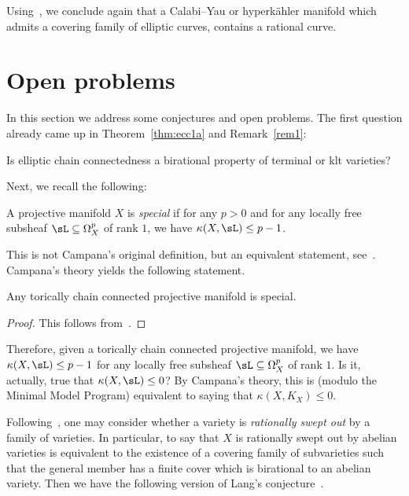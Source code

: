 Using~\cite{DFM16}, we conclude again that a Calabi--Yau or hyperkähler manifold which admits a covering family of elliptic curves, contains a rational curve.

\section{Open problems}\label{Sect.7}
In this section we address some conjectures and open problems. The first question already came up in Theorem~\ref{thm:ecc1a} and Remark~\ref{rem1}:

\begin{problem}\label{prob:main7.1}
Is elliptic chain connectedness a birational property of terminal or klt varieties?
\end{problem}

Next, we recall the following:

\begin{defi}\label{def:main7.2}
A projective manifold $X$ is \emph{special} if for any $p>0$ and for any locally free subsheaf $\sL \subseteq \Omega^p_X$ of rank $1$, we have $\kappa (X,\sL) \leq p-1$.
\end{defi}

This is not Campana's original definition, but an equivalent statement, see~\cite[Theorem~2.27]{Ca04a}. Campana's theory yields the following statement.

\begin{prop}\label{prop:main7.3}
Any torically chain connected projective manifold is special.
\end{prop}

\begin{proof}
This follows from~\cite[Theorem~3.3$\MK$(2) and Theorem~5.1]{Ca04a}.
\end{proof}

\begin{problem}\label{prob:main7.4}
Therefore, given a torically chain connected projective manifold, we have $\kappa (X, \sL) \leq p-1$ for any locally free subsheaf $\sL \subseteq \Omega^p_X $ of rank $1$. Is it, actually, true that $\kappa (X, \sL) \leq 0$? By Campana's theory, this is (modulo the Minimal Model Program) equivalent to saying that $\kappa (X,K_X) \leq 0$.
\end{problem}

Following~\cite[Definition~3.26]{Voi03}, one may consider whether a variety is \emph{rationally swept out} by a family of varieties. In particular, to say that $X$ is rationally swept out by abelian varieties is equivalent to the existence of a covering family of subvarieties such that the general member has a finite cover which is birational to an abelian variety. Then we have the following version of Lang's conjecture~\cite[Conjecture~3.31]{Voi03}.

